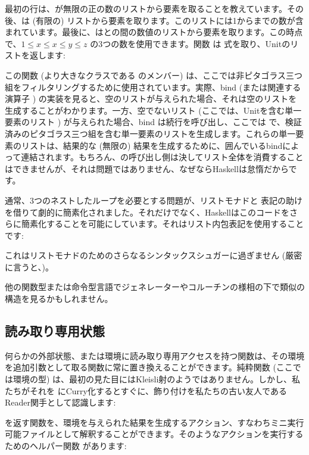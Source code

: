 最初の行は、が無限の正の数のリスト\code{{[}1..{]}}から要素を取ることを教えています。その後、は (有限の) リスト\code{{[}1..z{]}}から要素を取ります。このリストには1からまでの数が含まれています。最後に、はとの間の数値のリストから要素を取ります。この時点で、$1 \leqslant x \leqslant x \leqslant y \leqslant z$ の3つの数を使用できます。関数  は  式を取り、Unitのリストを返します: 

この関数 (より大きなクラスである  のメンバー) は、ここでは非ピタゴラス三つ組をフィルタリングするために使用されています。実際、bind (または関連する演算子 \code{>>}) の実装を見ると、空のリストが与えられた場合、それは空のリストを生成することがわかります。一方、空でないリスト (ここでは、Unitを含む単一要素のリスト \code{{[}(){]}}) が与えられた場合、bind は続行を呼び出し、ここでは  で、検証済みのピタゴラス三つ組を含む単一要素のリストを生成します。これらの単一要素のリストは、結果的な (無限の) 結果を生成するために、囲んでいるbindによって連結されます。もちろん、の呼び出し側は決してリスト全体を消費することはできませんが、それは問題ではありません、なぜならHaskellは怠惰だからです。

通常、3つのネストしたループを必要とする問題が、リストモナドと  表記の助けを借りて劇的に簡素化されました。それだけでなく、Haskellはこのコードをさらに簡素化することを可能にしています。それはリスト内包表記を使用することです: 

これはリストモナドのためのさらなるシンタックスシュガーに過ぎません (厳密に言うと、)。

他の関数型または命令型言語でジェネレーターやコルーチンの様相の下で類似の構造を見るかもしれません。

\subsection{読み取り専用状態}

何らかの外部状態、または環境に読み取り専用アクセスを持つ関数は、その環境を追加引数として取る関数に常に置き換えることができます。純粋関数  (ここで  は環境の型) は、最初の見た目にはKleisli射のようではありません。しかし、私たちがそれを
 にCurry化するとすぐに、飾り付けを私たちの古い友人であるReader関手として認識します: 

 を返す関数を、環境を与えられた結果を生成するアクション、すなわちミニ実行可能ファイルとして解釈することができます。そのようなアクションを実行するためのヘルパー関数  があります: 

